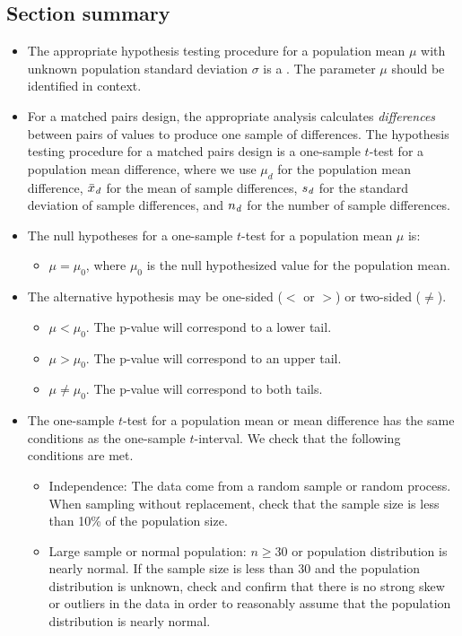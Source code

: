 \subsection*{Section summary}
\begin{itemize} 

\item The appropriate hypothesis testing procedure for a population mean $\mu$ with unknown population standard deviation $\sigma$ is a .  The parameter $\mu$ should be identified in context.  

\item For a matched pairs design, the appropriate analysis calculates \emph{differences} between pairs of values to produce one sample of differences.  The hypothesis testing procedure for a matched pairs design is a one-sample $t$-test for a population mean difference, where we use $\mu_d$ for the population mean difference, $\bar{x}_{\text{\emph{d}}}$ for the mean of sample differences, $s_{\text{\emph{d}}}$ for the standard deviation of sample differences, and $n_{\text{\emph{d}}}$ for the number of sample differences.

\item The null hypotheses for a one-sample $t$-test for a population mean $\mu$ is:  
\begin{itemize}
\setlength{\itemindent}{3mm}
\item[$H_0$:] $\mu=\mu_0$, where $\mu_0$ is the null hypothesized value for the population mean.
\end{itemize}


\item The alternative hypothesis may be one-sided ($<$ or $>$) or two-sided ($\ne$).
\begin{itemize}
\setlength{\itemindent}{3mm}
\item[$H_A$:] $\mu<\mu_0$.  The p-value will correspond to a lower tail.
\item[$H_A$:] $\mu>\mu_0$.   The p-value will correspond to an upper tail.
\item[$H_A$:] $\mu\ne \mu_0$.  The p-value will correspond to both tails.
\end{itemize}

\item The one-sample $t$-test for a population mean or mean difference has the same conditions as the one-sample $t$-interval.  We check that the following conditions are met.
\begin{itemize}
\item[1.] Independence:  The data come from a random sample or random process.  When sampling without replacement, check that the sample size is less than 10\% of the population size.
\item[2.] Large sample or normal population: $n\ge 30$ or population distribution is nearly normal. If the sample size is less than 30 and the population distribution is unknown, check and confirm that there is no strong skew or outliers in the data in order to reasonably assume that the population distribution is nearly normal.
\end{itemize}


\end{itemize}
